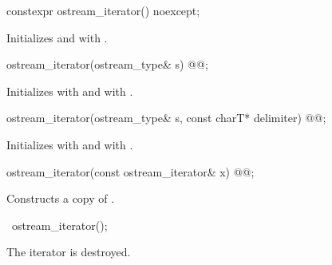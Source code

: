 \begin{addedblock}
%
\begin{itemdecl}
constexpr ostream_iterator() noexcept;
\end{itemdecl}

\begin{itemdescr}
\pnum
\effects
Initializes  and  with .
\end{itemdescr}
\end{addedblock}

%
\begin{itemdecl}
ostream_iterator(ostream_type& s) @@;
\end{itemdecl}

\begin{itemdescr}
\pnum
\effects
Initializes  with  and  with .
\end{itemdescr}

%
\begin{itemdecl}
ostream_iterator(ostream_type& s, const charT* delimiter) @@;
\end{itemdecl}

\begin{itemdescr}
\pnum
\effects
Initializes  with  and  with .
\end{itemdescr}

%
\begin{itemdecl}
ostream_iterator(const ostream_iterator& x) @@;
\end{itemdecl}

\begin{itemdescr}
\pnum
\effects
Constructs a copy of .
\end{itemdescr}

%
\begin{itemdecl}
~ostream_iterator();
\end{itemdecl}

\begin{itemdescr}
\pnum
\effects
The iterator is destroyed.
\end{itemdescr}

